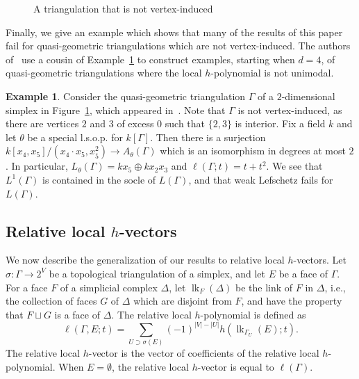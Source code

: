\documentclass[11pt]{article}
\theoremstyle{definition}
\newtheorem{example}[theo]{Example}
\numberwithin{equation}{section}
\numberwithin{equation}{section}
\begin{document}
\begin{figure}
\begin{center}
\end{center}
\caption{A triangulation that is not vertex-induced}\label{fig:noninduced}
\end{figure}

Finally, we give an example which shows that many of the results of this paper fail for quasi-geometric triangulations which are not vertex-induced. The authors of~\cite{JKSS} use a cousin of Example~\ref{ex:nonvertexinduced} to construct examples, starting when $d=4$, of quasi-geometric triangulations where the local $h$-polynomial is not unimodal.

\begin{example}\label{ex:nonvertexinduced}
Consider the quasi-geometric triangulation $\Gamma$ of a $2$-dimensional simplex in Figure~\ref{fig:noninduced}, which appeared in~\cite[Figure 1(c)]{JKSS}. Note that $\Gamma$ is not vertex-induced, as there are vertices $2$ and $3$ of excess $0$ such that $\{2, 3\}$ is interior. 
Fix a field $k$ 
and let $\theta$ be a special l.s.o.p. for $k[\Gamma]$. 
Then there is a surjection $k[x_4,x_5]/(x_4 \cdot x_5, x_5^2) \to A_\theta(\Gamma)$ which is an isomorphism in degrees at most $2$. 
In particular, $L_\theta(\Gamma) = k x_5 \oplus k x_2 x_3$ and $\ell(\Gamma; t) = t + t^2$. 
We see that $L^1(\Gamma)$ is contained in the socle of $L(\Gamma)$, and that weak Lefschetz fails for $L(\Gamma)$. 
\end{example}

\subsection{Relative local \texorpdfstring{$h$}{h}-vectors}\label{ssec:relative}

We now describe the generalization of our results to relative local $h$-vectors. Let $\sigma \colon \Gamma \to 2^V$ be a topological triangulation of a simplex, and let $E$ be a face of $\Gamma$. For a face $F$ of a simplicial complex $\Delta$, let $\operatorname{lk}_F(\Delta)$ be the link of $F$ in $\Delta$, i.e., the collection of faces $G$ of $\Delta$ which are disjoint from $F$, and have the property that $F \sqcup G$ is a face of $\Delta$. The relative local $h$-polynomial is defined as
$$\ell(\Gamma, E; t) = \sum_{U \supset \sigma(E)} (-1)^{|V| - |U|} h(\operatorname{lk}_{\Gamma_U}(E); t).$$
The relative local $h$-vector is the vector of coefficients of the relative local $h$-polynomial. When $E = \emptyset$, the relative local $h$-vector is equal to $\ell(\Gamma)$. 
\end{document}
